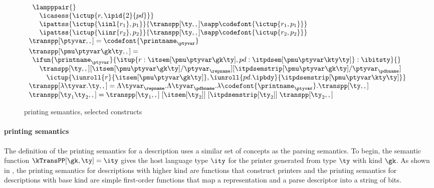 \begin{figure}
\[\begin{array}{l}
  \begin{array}{l}  
  \lampppair{} \\
  \quad \icasess {\ictup{r,\ipid{2}{pd}}} \\
  \quad \ipattss{\ictup{\iinl{r_1}, p_1}} 
	{ {\transpp[\ty,,]} \sapp \codefont{\ictup{r_1,p_1}}}\\
  \quad \ipattss{\ictup{\iinr{r_2}, p_2}} 
	{ {\transpp[\ty,,]} \sapp \codefont{\ictup{r_2,p_2}}}\\
  \end{array}
\\[3pt]
\transpp[\ptyvar,,] = \codefont{\printname_\ptyvar}
\\[3pt]
\transpp[\pmu \ptyvar \gk \ty,,] = \\
  \begin{array}{l}
  \ifun {\printname_\ptyvar} {\itup{r:\itsem[\pmu \ptyvar \gk \ty], pd:\itpdsem[\pmu \ptyvar \kty \ty]}
                     : \ibitsty} {}\\
  \quad \transpp[\ty,,][\itsem[\pmu \ptyvar \gk \ty]/\ptyvar_\repname]
          [\itpdsemstrip[\pmu \ptyvar \gk \ty]/\ptyvar_\pdbname] \\
  \qquad\ictup{\iunroll{r}{\itsem[\pmu \ptyvar \gk \ty]},
     \iunroll{pd.\ipbdy}{\itpdsemstrip[\pmu \ptyvar \kty \ty]}}
  \end{array}  
\\[3pt]
\transpp[\lambda\tyvar . \ty,,] = %
    \Lambda \tyvar_\repname. 
    \Lambda \tyvar_\pdbname. \lambda \codefont{\printname_\ptyvar}. \transpp[\ty,,]
\\
\transpp[\ty_1 \ty_2,,] = 
    \transpp[\ty_1,,]\; [\itsem[\ty_2]]\; [\itpdsemstrip[\ty_2]]\; \transpp[\ty_2,,]
\\
\end{array}
\]
\caption{\ddc{} printing semantics, selected constructs}
\label{fig:ddc-print-sem}
\end{figure}


\paragraph*{\ddc{} printing semantics}
\label{sec:print-sem}
The definition of the printing semantics for a \ddc{} description
uses a similar set of concepts as the parsing semantics.  To begin,
the semantic function $\kTransPP[\gk,\ty] = \ity$ gives the
host language type $\ity$ for the printer generated from type $\ty$
with kind $\gk$.  As shown in ,
the printing semantics for descriptions with higher kind are functions that
construct printers and the printing semantics for descriptions with base kind
are simple first-order functions that map a representation and a
parse descriptor into a string of bits.


